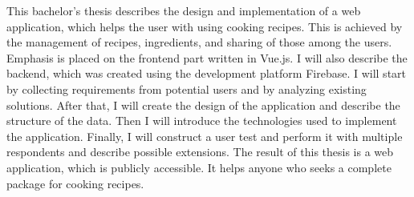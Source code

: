 
This bachelor's thesis describes the design and implementation of a web application, which helps the user with using cooking recipes.
This is achieved by the management of recipes, ingredients, and sharing of those among the users. Emphasis is placed on the frontend part written in Vue.js.
I will also describe the backend, which was created using the development platform Firebase. I will start by collecting requirements from potential users
and by analyzing existing solutions. After that, I will create the design of the application and describe the structure of the data. Then I will introduce
the technologies used to implement the application. Finally, I will construct a user test and perform it with multiple respondents and describe possible extensions.
The result of this thesis is a web application, which is publicly accessible. It helps anyone who seeks a complete package for cooking recipes.
